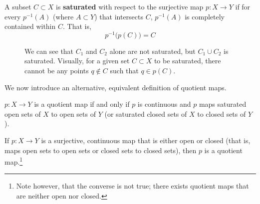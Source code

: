   \begin{definition}[Saturation]
    A subset $C \subset X$ is \textbf{saturated} with respect to the surjective map $p: X \rightarrow Y$ if for every $p^{-1} (A)$ (where $A \subset Y$) that intersects $C$, $p^{-1}(A)$ is completely contained within $C$. That is, 
    \begin{equation}
      p^{-1} \big( p(C) \big) = C
    \end{equation}

    \begin{figure}[H]
      \centering 
      \caption{We can see that $C_1$ and $C_2$ alone are not saturated, but $C_1 \cup C_2$ is saturated. Visually, for a given set $C \subset X$ to be saturated, there cannot be any points $q \not\in C$ such that $q \in p(C)$. }
      \label{fig:saturation}
    \end{figure}
  \end{definition}

  We now introduce an alternative, equivalent definition of quotient maps. 

  \begin{theorem}
    $p: X \rightarrow Y$ is a quotient map if and only if $p$ is continuous and $p$ maps saturated open sets of $X$ to open sets of $Y$ (or saturated closed sets of $X$ to closed sets of $Y$). 
  \end{theorem}

  \begin{proposition}
    If $p: X \rightarrow Y$ is a surjective, continuous map that is either open or closed (that is, maps open sets to open sets or closed sets to closed sets), then $p$ is a quotient map.\footnote{Note however, that the converse is not true; there exists quotient maps that are neither open nor closed. }
  \end{proposition}


